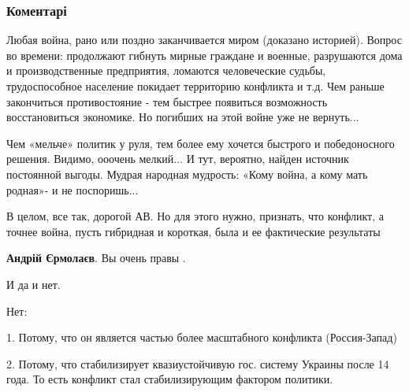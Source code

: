  
 
 
 
 
\subsubsection{Коментарі}

\begin{itemize} %

Любая война, рано или поздно заканчивается миром (доказано историей). Вопрос во
времени: продолжают гибнуть мирные граждане и военные, разрушаются дома и
производственные предприятия, ломаются человеческие судьбы, трудоспособное
население покидает территорию конфликта и т.д. Чем раньше закончиться
противостояние - тем быстрее появиться возможность восстановиться экономике. Но
погибших на этой войне уже не вернуть...


Чем «мельче» политик у руля, тем более ему хочется быстрого и победоносного
решения. Видимо, ооочень мелкий... И тут, вероятно, найден источник постоянной
выгоды. Мудрая народная мудрость: «Кому война, а кому мать родная»- и не
поспоришь...


В целом, все так, дорогой АВ. Но для этого нужно, признать, что конфликт, а
точнее война, пусть гибридная и короткая, была и ее фактические результаты


\textbf{Андрій Єрмолаєв}. Вы очень правы .


И да и нет.

Нет:

1. Потому, что он является частью более масштабного конфликта (Россия-Запад)

2. Потому, что стабилизирует квазиустойчивую гос. систему Украины после 14
года. То есть конфликт стал стабилизирующим фактором политики.

\end{itemize} %

